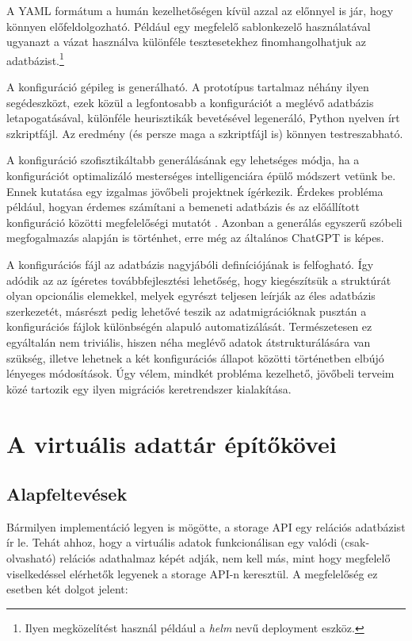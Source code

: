 \documentclass[
    parspace,
    noindent,
    nohyp,
]{elteiktdk}[2023/04/10]
\newcommand{\todoref}[1]{\todo[inline, noinlinepar, color=red, textcolor=white, inlinewidth=0.6cm, caption={#1}]{\large \textbf{×}}}
\begin{document}
A YAML formátum a humán kezelhetőségen kívül azzal az előnnyel is jár, hogy könnyen előfeldolgozható.
Például egy megfelelő sablonkezelő használatával ugyanazt a vázat használva
különféle tesztesetekhez finomhangolhatjuk az adatbázist.\footnote{
    Ilyen megközelítést használ például a \textit{helm} nevű deployment eszköz.
    \todoref{Mi az a Helm? Milyen megközelítés ez?}
}

A konfiguráció gépileg is generálható.
A prototípus tartalmaz néhány ilyen segédeszközt,
ezek közül a legfontosabb a konfigurációt a meglévő adatbázis letapogatásával,
különféle heurisztikák bevetésével legeneráló, Python nyelven írt szkriptfájl.
Az eredmény (és persze maga a szkriptfájl is) könnyen testreszabható.

A konfiguráció szofisztikáltabb generálásának egy lehetséges módja,
ha a konfigurációt optimalizáló mesterséges intelligenciára épülő módszert vetünk be.
Ennek kutatása egy izgalmas jövőbeli projektnek ígérkezik.
Érdekes probléma például, hogyan érdemes számítani a bemeneti adatbázis
és az előállított konfiguráció közötti megfelelőségi mutatót%
\cite{Erritali2016DocumentSimilarity}.
Azonban a generálás egyszerű szóbeli megfogalmazás alapján is történhet,
erre még az általános ChatGPT is képes.

A konfigurációs fájl az adatbázis nagyjábóli definíciójának is felfogható.
Így adódik az az ígéretes továbbfejlesztési lehetőség,
hogy kiegészítsük a struktúrát olyan opcionális elemekkel,
melyek egyrészt teljesen leírják az éles adatbázis szerkezetét,
másrészt pedig lehetővé teszik az adatmigrációknak
pusztán a konfigurációs fájlok különbségén alapuló automatizálását.
Természetesen ez egyáltalán nem triviális,
hiszen néha meglévő adatok átstrukturálására van szükség,
illetve lehetnek a két konfigurációs állapot közötti történetben elbújó lényeges módosítások.
Úgy vélem, mindkét probléma kezelhető,
jövőbeli terveim közé tartozik egy ilyen migrációs keretrendszer kialakítása.



\chapter{A virtuális adattár építőkövei}

\section{Alapfeltevések}

Bármilyen implementáció legyen is mögötte, a storage API egy relációs adatbázist ír le.
Tehát ahhoz, hogy a virtuális adatok funkcionálisan egy valódi (csak-olvasható) relációs adathalmaz képét adják,
nem kell más, mint hogy megfelelő viselkedéssel elérhetők legyenek a storage API-n keresztül.
A megfelelőség ez esetben két dolgot jelent:
\end{document}

